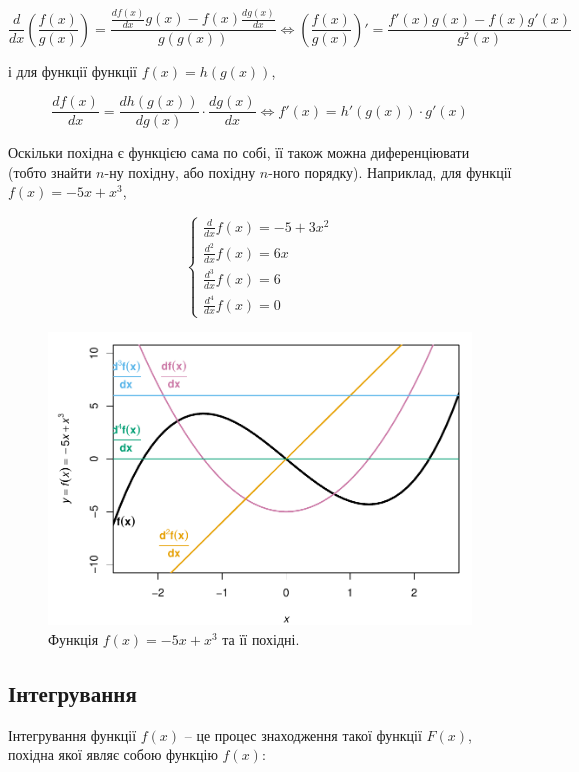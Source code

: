 \documentclass[
  11pt,
]{book}
\begin{document}
\[\frac{d}{dx} \left( \frac{f(x)}{g(x)}\right) = \frac{\frac{df(x)}{dx}g(x) - f(x) \frac{dg(x)}{dx}}{g(g(x))} \iff \left( \frac{f(x)}{g(x)} \right)' = \frac{f'(x)g(x) - f(x)g'(x)}{g^2(x)}\]

і для функції функції \(f(x) = h(g(x))\),

\[\frac{df(x)}{dx} = \frac{dh(g(x))}{dg(x)} \cdot \frac{dg(x)}{dx} \iff f'(x) = h'(g(x)) \cdot g'(x)\]

Оскільки похідна є функцією сама по собі, її також можна диференціювати (тобто знайти \(n\)-ну похідну, або похідну \(n\)-ного порядку). Наприклад, для функції \(f(x) = -5x + x^3\),

\[\begin{cases}
\frac{d}{dx}f(x) = -5 + 3x^2 \\
\frac{d^2}{dx}f(x) = 6x \\
\frac{d^3}{dx}f(x) = 6 \\
\frac{d^4}{dx}f(x) = 0
\end{cases}\]

\begin{figure}
\centering
\includegraphics{bookdown-demo_files/figure-latex/fig-3-5-1.pdf}
\caption{\label{fig:fig-3-5}Функція \(f(x) = -5x + x^3\) та її похідні.}
\end{figure}

\subsection{Інтегрування}\label{ux456ux43dux442ux435ux433ux440ux443ux432ux430ux43dux43dux44f}

Інтегрування функції \(f(x)\) -- це процес знаходження такої функції \(F(x)\), похідна якої являє собою функцію \(f(x)\):
\end{document}
